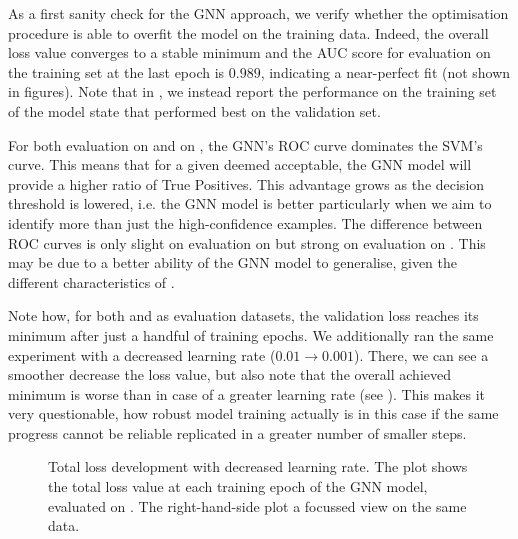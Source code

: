 \documentclass[
	fontsize=10pt, %
	twoside=false, %
	secnumdepth=1, %
  toc=indentunnumbered %
]{kaobook}
\begin{document}
As a first sanity check for the GNN approach, we verify whether the optimisation
procedure is able to overfit the model on the training data. Indeed, the overall
loss value converges to a stable minimum and the AUC score for evaluation on the
training set at the last epoch is $0.989$, indicating a near-perfect fit (not
shown in figures). Note that in , we instead report
the performance on the training set of the model state that performed best on
the validation set.

For both evaluation on \PDMap and on
\ReconMap{}, the GNN's ROC curve dominates the SVM's curve. This means that for a
given \FPR{} deemed acceptable, the GNN model will provide a higher ratio of True
Positives. This advantage grows as the decision threshold is lowered, i.e. the
GNN model is better particularly when we aim to identify more than just the
high-confidence examples. The difference between ROC curves is only slight on
evaluation on \PDMap but strong on evaluation on \ReconMap{}. This may be due to a
better ability of the GNN model to generalise, given the different
characteristics of \ReconMap{}.

Note how, for both \PDMap and \ReconMap{} as evaluation datasets, the validation
loss reaches its minimum after just a handful of training epochs. We
additionally ran the same experiment with a decreased learning rate ($0.01
\rightarrow 0.001$). There, we can see a smoother decrease the loss value, but
also note that the overall achieved minimum is worse than in case of a greater
learning rate (see ). This makes it
very questionable, how robust model training actually is in this case if the
same progress cannot be reliable replicated in a greater number of smaller steps.
\begin{figure}[h]
  \centering
  \begin{subfigure}[h]{0.49\linewidth}
  \end{subfigure}
  \begin{subfigure}[h]{0.49\linewidth}
  \end{subfigure}
  \caption{Total loss development with decreased learning rate. The plot shows
    the total loss value at each training epoch of the GNN model, evaluated on
    \ReconMap{}. The right-hand-side plot a focussed view on the same data.}
  \label{fig:svm-repro-lowlr-reconmapolder-loss}
\end{figure}
\end{document}
